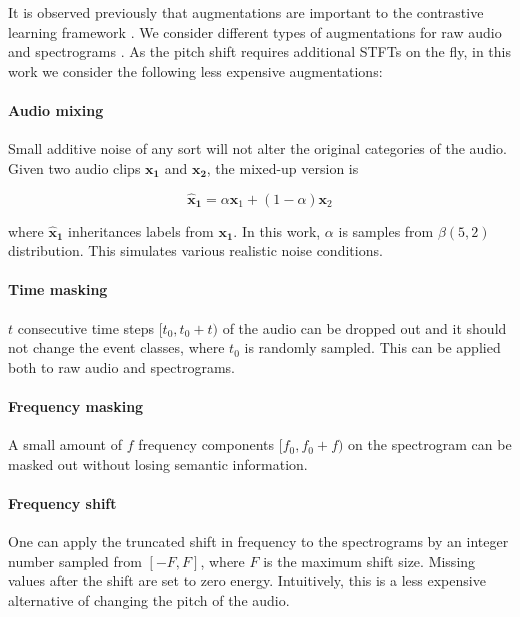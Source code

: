 \documentclass{article}
\begin{document}
It is observed previously that augmentations are important to the contrastive learning framework \cite{bachman2019learning, henaff2020data, chen2020simple}. We consider different types of augmentations for raw audio and spectrograms \cite{jansen2018unsupervised, park2019specaugment, kharitonov2020data}. As the pitch shift requires additional STFTs on the fly, in this work we consider the following less expensive augmentations:

\paragraph{Audio mixing}

Small additive noise of any sort will not alter the original categories of the audio. Given two audio clips $\mathbf{x_1}$ and $\mathbf{x_2}$, the mixed-up version is

\begin{equation}\label{eq2}
  \mathbf{\hat{x}_1} = \alpha \mathbf{x}_1 + (1 - \alpha) \mathbf{x}_2
\end{equation}

where $\mathbf{\hat{x}_1}$ inheritances labels from $\mathbf{x_1}$. In this work, $\alpha$ is samples from $\beta(5, 2)$ distribution. This simulates various realistic noise conditions.

\paragraph{Time masking}

$t$ consecutive time steps $[t_0, t_0 + t)$ of the audio can be dropped out and it should not change the event classes, where $t_0$ is randomly sampled. This can be applied both to raw audio and spectrograms.

\paragraph{Frequency masking}

A small amount of $f$ frequency components $[f_0, f_0 + f)$ on the spectrogram can be masked out without losing semantic information.

\paragraph{Frequency shift}

One can apply the truncated shift in frequency to the spectrograms by an integer number sampled from $[-F, F]$, where $F$ is the maximum shift size. Missing values after the shift are set to zero energy. Intuitively, this is a less expensive alternative of changing the pitch of the audio.
\end{document}
